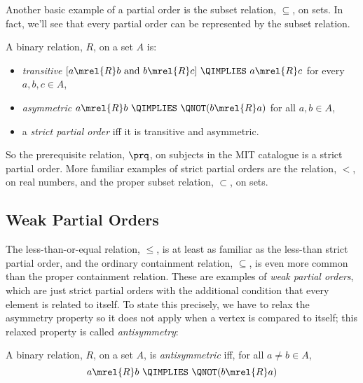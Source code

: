 Another basic example of a partial order is the subset relation,
$\subseteq$, on sets.  In fact, we'll see that every partial order can be
represented by the subset relation.

\begin{definition}
A binary relation, $R$, on a set $A$ is:
\begin{itemize}

\item \emph{transitive} \qiff 
$[a \mrel{R}  b \text{ and } b \mrel{R}  c]\ \QIMPLIES\  a \mrel{R}  c$
\quad for every $a,b,c\in A$,

\item \emph{asymmetric} \qiff
$a \mrel{R}  b\  \QIMPLIES\  \QNOT(b \mrel{R}  a)$
\quad for all $a,b\in A$,

\item a \emph{strict partial order} iff it is transitive and asymmetric.
\end{itemize}

\end{definition}

So the prerequisite relation, $\prq$, on subjects in the MIT catalogue is
a strict partial order.  More familiar examples of strict partial orders
are the relation, $<$, on real numbers, and the proper subset relation,
$\subset$, on sets.
\fi

\subsection{Weak Partial Orders}
The less-than-or-equal relation, $\leq$, is at least as familiar as
the less-than strict partial order, and the ordinary containment
relation, $\subseteq$, is even more common than the proper containment
relation.  These are examples of \emph{weak partial orders},%
which are just strict partial orders with the additional condition that every
element is related to itself.  To state this precisely, we have to
relax the asymmetry property so it does not apply when a vertex is
compared to itself; this relaxed property%
 is called
\emph{antisymmetry}:

\begin{definition}\label{antis}
A binary relation, $R$, on a set $A$, is \emph{antisymmetric}%
iff, for all $a \neq b \in A$,
\[
a \mrel{R}  b\ \QIMPLIES\ \QNOT(b \mrel{R}  a)
\]
\end{definition}

